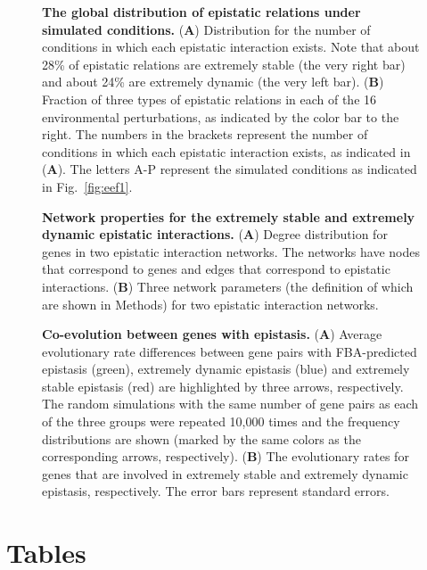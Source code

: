 \documentclass[10pt]{article}
\newcommand{\Fig}{Fig.}
\begin{document}
\begin{figure}
\caption{
{\bf The global distribution of epistatic relations under simulated
conditions.} (\textbf{A}) Distribution for the number of conditions in which
each epistatic interaction exists. Note that about 28\% of
epistatic relations are extremely stable (the very right bar) and
about 24\% are extremely dynamic (the very left bar). (\textbf{B}) Fraction
of three types of epistatic relations in each of the 16 environmental
perturbations, as indicated by the color bar to the right. The numbers
in the brackets represent the number of conditions in which each
epistatic interaction exists, as indicated in (\textbf{A}). The letters A-P
represent the simulated conditions as indicated in \Fig~\ref{fig:eef1}.
}
\label{fig:eef3}
\end{figure}

\begin{figure}
\caption{
{\bf Network properties for the extremely stable and extremely dynamic
epistatic interactions.} (\textbf{A}) Degree distribution for genes in two
epistatic interaction networks. The networks have nodes that
correspond to genes and edges that correspond to epistatic
interactions. (\textbf{B}) Three network parameters (the definition of which
are shown in Methods) for two epistatic interaction networks.
}
\label{fig:eef4}
\end{figure}

\begin{figure}
\caption{
{\bf Co-evolution between genes with epistasis.} (\textbf{A}) Average evolutionary
rate differences between gene pairs with FBA-predicted epistasis
(green), extremely dynamic epistasis (blue) and extremely stable
epistasis (red) are highlighted by three arrows, respectively. The
random simulations with the same number of gene pairs as each of the
three groups were repeated 10,000 times and the frequency
distributions are shown (marked by the same colors as the
corresponding arrows, respectively). (\textbf{B}) The evolutionary rates for
genes that are involved in extremely stable and extremely dynamic
epistasis, respectively. The error bars represent standard errors.
}
\label{fig:eef5}
\end{figure}


\section*{Tables}
% 
%
%
\end{document}
